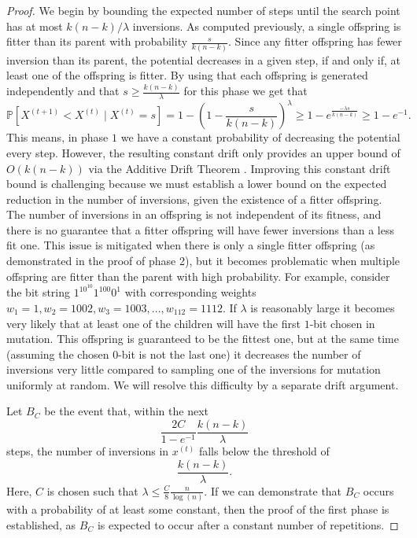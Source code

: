 \begin{proof}
    \vspace{4mm}
    We begin by bounding the expected number of steps until the search point has at most $k(n-k)/\lambda$ inversions. As computed previously, a single offspring is fitter than its parent with probability $\frac{s}{k(n-k)}$. Since any fitter offspring has fewer inversion than its parent, the potential decreases in a given step, if and only if, at least one of the offspring is fitter. By using that each offspring is generated independently and that $s \ge \frac{k(n-k)}{\lambda}$ for this phase we get that 
    \begin{displaymath}
        \mathbb{P}[X^{(t+1)} < X^{(t)} \; | \;X^{(t)}=s] = 1-(1-\frac{s}{k(n-k)})^\lambda \ge 1-e^{\frac{-\lambda s}{k(n-k)}} \ge 1 - e^{-1}.
    \end{displaymath}
    This means, in phase $1$ we have a constant probability of decreasing the potential every step. However, the resulting constant drift only provides an upper bound of $O(k(n-k))$ via the Additive Drift Theorem \citep{he_ADT}. Improving this constant drift bound is challenging because we must establish a lower bound on the expected reduction in the number of inversions, given the existence of a fitter offspring. The number of inversions in an offspring is not independent of its fitness, and there is no guarantee that a fitter offspring will have fewer inversions than a less fit one. This issue is mitigated when there is only a single fitter offspring (as demonstrated in the proof of phase 2), but it becomes problematic when multiple offspring are fitter than the parent with high probability. For example, consider the bit string $1^10^{10}1^{100}0^1$ with corresponding weights $w_1=1,w_2=1002,w_3=1003, ..., w_{112}=1112$. If $\lambda$ is reasonably large it becomes very likely that at least one of the children will have the first $1$-bit chosen in mutation. This offspring is guaranteed to be the fittest one, but at the same time (assuming the chosen $0$-bit is not the last one) it decreases the number of inversions very little compared to sampling one of the inversions for mutation uniformly at random. We will resolve this difficulty by a separate drift argument.

 
    Let $B_C$ be the event that, within the next 
    \begin{displaymath}
    \frac{2C}{1-e^{-1}} \frac{k(n-k)}{\lambda}
    \end{displaymath}
    steps, the number of inversions in $x^{(t)}$ falls below the threshold of 
    \begin{displaymath}
    \frac{k(n-k)}{\lambda}.
    \end{displaymath}
    Here, $ C $ is chosen such that $ \lambda \leq \frac{C}{8} \frac{n}{\log(n)} $. If we can demonstrate that $ B_C $ occurs with a probability of at least some constant, then the proof of the first phase is established, as $ B_C $ is expected to occur after a constant number of repetitions.
    

\end{proof}
